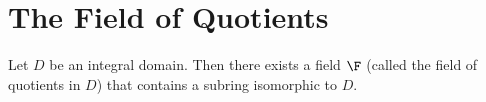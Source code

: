 \section{The Field of Quotients}

\begin{theorem}
	Let $D$ be an integral domain. Then there exists a field $\F$ (called the field of quotients in $D$) that contains a subring isomorphic to $D$.
\end{theorem}
